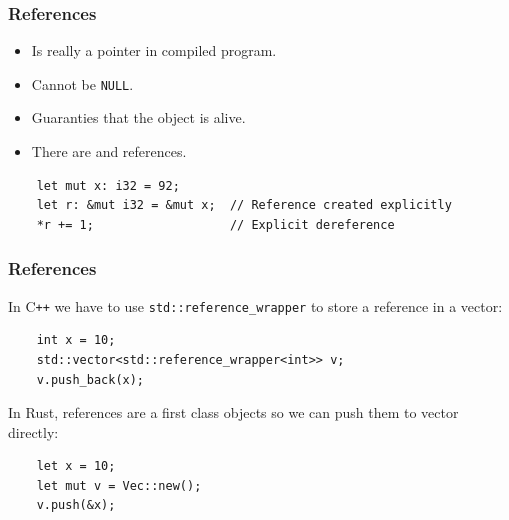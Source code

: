 \documentclass[aspectratio=1610,t]{beamer}
\begin{document}

\begin{frame}[fragile]
\frametitle{References}
\begin{itemize}
    \item Is really a pointer in compiled program.
    \item Cannot be \texttt{NULL}.
    \item Guaranties that the object is alive.
    \item There are \textt{\&} and  references.
\end{itemize}

\begin{verbatim}
    let mut x: i32 = 92;
    let r: &mut i32 = &mut x;  // Reference created explicitly
    *r += 1;                   // Explicit dereference
\end{verbatim}
\end{frame}


\begin{frame}[fragile]
\frametitle{References}
In C\texttt{++} we have to use \texttt{std::reference\_wrapper} to store a reference in a vector:

\begin{verbatim}
    int x = 10;
    std::vector<std::reference_wrapper<int>> v;
    v.push_back(x);
\end{verbatim}

In Rust, references are a first class objects so we can push them to vector directly:

\begin{verbatim}
    let x = 10;
    let mut v = Vec::new();
    v.push(&x);
\end{verbatim}
\end{frame}

\end{document}
